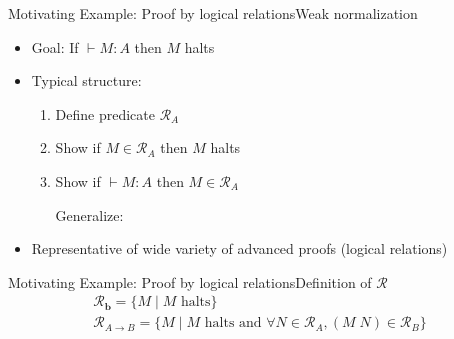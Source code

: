 \documentclass[usenames,dvipsnames]{beamer}
\newcommand{\const}[1]{\textbf{#1}}
\newcommand{\arrow}{\to}
\newcommand{\stepsto}{\longrightarrow}
\begin{document}
\begin{frame}[fragile]{Motivating Example: Proof by logical relations}{Weak normalization}
\begin{itemize}
\item Goal: If $\vdash M : A$ then $M$ halts
\pause \item Typical structure:
\begin{enumerate}
\item Define predicate $\mathcal{R}_A$
\item Show if $M \in \mathcal{R}_A$ then $M$ halts
\item Show if $\vdash M : A$ then $M \in \mathcal{R}_A$
\pause

Generalize: 
\end{enumerate}
\pause \item Representative of wide variety of advanced proofs (logical relations)
\end{itemize}

\end{frame}

\begin{frame}{Motivating Example: Proof by logical relations}{Definition of $\mathcal{R}$}
\[
\begin{array}{l}
\mathcal{R}_{\const b} = \{M\; |\; M \text{ halts}\} \\
\mathcal{R}_{A \arrow B} = \{M\; |\; M \text{ halts and } \forall N
\in \mathcal{R}_A, (M\; N) \in \mathcal{R}_B \}
\end{array}
\]
\end{frame}
\end{document}
